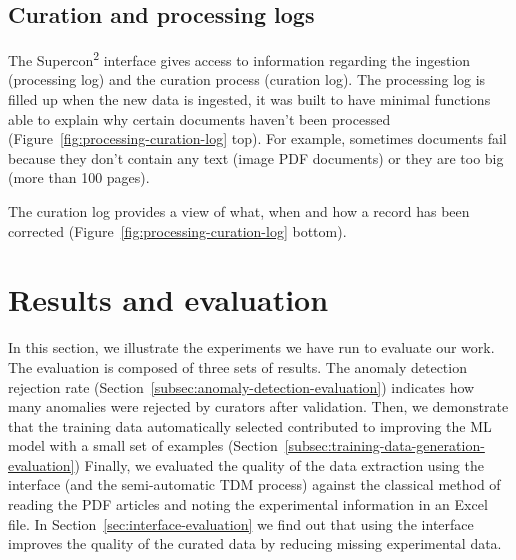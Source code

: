 \documentclass[]{interact}
\theoremstyle{plain} %
\theoremstyle{definition}
\theoremstyle{remark}
\begin{document}
\subsection{Curation and processing logs}
\label{subsec:curation-and-processing-logs}

The Supercon\textsuperscript{2} interface gives access to information regarding the ingestion (processing log) and the curation process (curation log). 
The processing log is filled up when the new data is ingested, it was built to have minimal functions able to explain why certain documents haven't been processed (Figure~\ref{fig:processing-curation-log} top). 
For example, sometimes documents fail because they don't contain any text (image PDF documents) or they are too big (more than 100 pages). 


The curation log provides a view of what, when and how a record has been corrected (Figure~\ref{fig:processing-curation-log} bottom).


\section{Results and evaluation}
\label{sec:results-and-evaluation}

In this section, we illustrate the experiments we have run to evaluate our work. 
The evaluation is composed of three sets of results. 
The anomaly detection rejection rate (Section~\ref{subsec:anomaly-detection-evaluation}) indicates how many anomalies were rejected by curators after validation. 
Then, we demonstrate that the training data automatically selected contributed to improving the ML model with a small set of examples (Section~\ref{subsec:training-data-generation-evaluation}) 
Finally, we evaluated the quality of the data extraction using the interface (and the semi-automatic TDM process) against the classical method of reading the PDF articles and noting the experimental information in an Excel file. In Section~\ref{sec:interface-evaluation} we find out that using the interface improves the quality of the curated data by reducing missing experimental data. 
\end{document}
